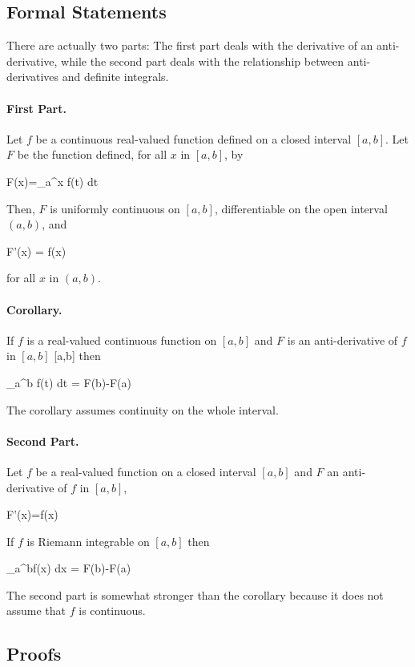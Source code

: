 \subsection{Formal Statements}

There are actually two parts: The first part deals with the derivative of an anti-derivative, while the second part deals with the relationship between anti-derivatives and definite integrals. 

\paragraph{First Part.} Let $f$ be a continuous real-valued function defined on a closed interval $[a, b]$. Let $F$ be the function defined, for all $x$ in $[a, b]$, by

\bee
F(x)=\int_{a}^{x} f(t) dt
\eee

Then, $F$ is uniformly continuous on $[a, b]$, differentiable on the open interval $(a, b)$, and

\bee
F'(x) = f(x)
\eee

for all $x$ in $(a, b)$.

\paragraph{Corollary.} If $f$ is a real-valued continuous function on $[ a , b ]$ and $F$ is an anti-derivative of $f$ in $[ a , b ]$ [a,b] then

\bee
\int _{a}^{b} f(t) dt = F(b)-F(a)
\eee

The corollary assumes continuity on the whole interval. 

\paragraph{Second Part.} Let $f$ be a real-valued function on a closed interval $[a,b]$ and $F$ an anti-derivative of $f$ in $[a,b]$, 

\bee
F'(x)=f(x)
\eee

If $f$ is Riemann integrable on $[a,b]$ then

\bee
\int_{a}^{b}f(x) dx = F(b)-F(a)
\eee

The second part is somewhat stronger than the corollary because it does not assume that $f$ is continuous.


\subsection{Proofs}

